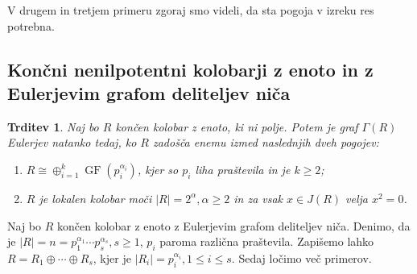 \documentclass[a4paper, 12pt]{amsart}
\theoremstyle{definition} %
\theoremstyle{plain} %
\newtheorem{trditev}[definicija]{Trditev}
\DeclareMathOperator{\GF}{GF}
\begin{document}
V drugem in tretjem primeru zgoraj smo videli, da sta pogoja v izreku res potrebna.


\subsection{Končni nenilpotentni kolobarji z enoto in z Eulerjevim grafom deliteljev niča}

\begin{trditev}
\label{EulerEnotski}
Naj bo $R$ končen kolobar z enoto, ki ni polje. Potem je graf $\Gamma(R)$ Eulerjev natanko tedaj, ko $R$ zadošča enemu izmed naslednjih dveh pogojev:
\begin{enumerate}
\item $R \cong \oplus_{i=1}^k \GF(p_i^{\alpha_i})$, kjer so $p_i$ liha praštevila in je $k\ge 2$;
\item $R$ je lokalen kolobar moči $|R| = 2^{\alpha}, \alpha \ge 2$ in za vsak $x\in J(R)$ velja $x^2 = 0$.
\end{enumerate}
\end{trditev}

\proof
Naj bo $R$ končen kolobar z enoto z Eulerjevim grafom deliteljev niča. Denimo, da je $|R| = n = p_1^{\alpha_1}\cdots p_s^{\alpha_s}, s\ge 1$, $p_i$ paroma različna praštevila. Zapišemo lahko $R=R_1\oplus \cdots \oplus R_s$, kjer je $|R_i| = p_i^{\alpha_i}, 1 \le i \le s$. Sedaj ločimo več primerov.
\end{document}
